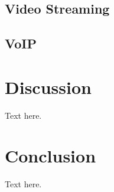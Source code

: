 \documentclass{article}
\begin{document}
\subsection{Video Streaming}

\subsection{VoIP}


\section{Discussion}
Text here.

\section{Conclusion}
Text here.



\end{document}
